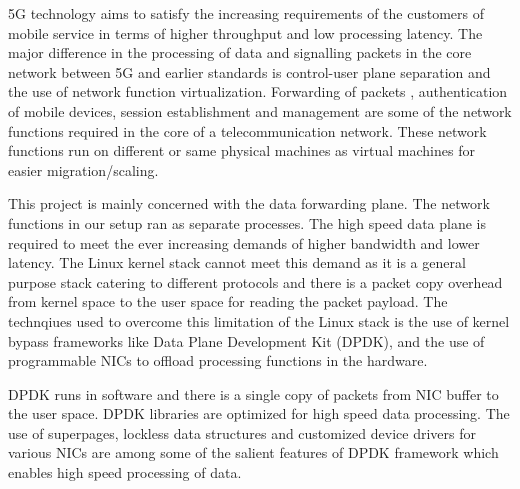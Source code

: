 5G technology aims to satisfy the increasing requirements of the customers of mobile service 
in terms of higher throughput and low processing latency. 
The major difference in  the processing of data and signalling packets in the core network between 5G and earlier standards is control-user plane 
separation and the use of network function virtualization. Forwarding of packets , 
authentication of mobile devices, session establishment and management  are some of the network functions required in the core of a telecommunication network. 
These network functions run on different or same physical machines as 
virtual machines for easier migration/scaling. 

This project is mainly concerned with the data forwarding plane. The network functions in our setup ran as separate processes.
The high speed data plane is required to meet the ever increasing demands of higher bandwidth and lower latency. The Linux kernel stack cannot meet this demand as it is a general purpose stack catering to different protocols and there is a packet copy overhead from kernel space to the user space for reading the packet payload. The technqiues used to overcome this limitation of the Linux stack is the use of kernel bypass frameworks like Data Plane Development Kit (DPDK), and the use of programmable NICs to offload processing functions in the hardware. 

DPDK runs in software and there is a single copy of packets from NIC buffer to the
 user space. DPDK libraries are optimized for high speed data processing. The use
  of superpages, lockless data structures and customized device drivers for
   various NICs are among some of the salient features of DPDK framework which
   enables high speed processing of data.
